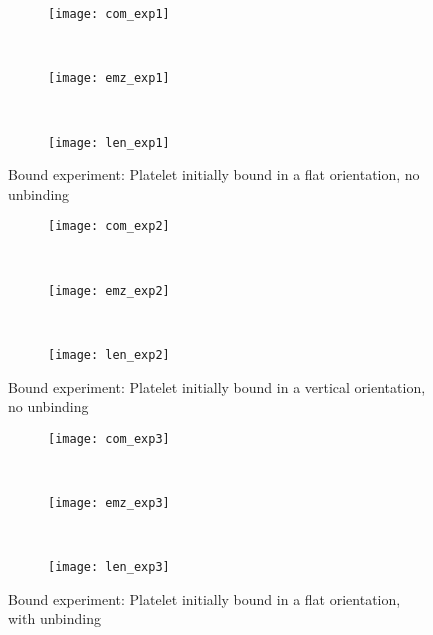 \documentclass{article}
\begin{document}
\begin{figure}
  \centering
  \begin{subfigure}{.5\textwidth}
    \texttt{[image: com\_exp1]}
  \end{subfigure}
  \\
  \begin{subfigure}{.5\textwidth}
    \texttt{[image: emz\_exp1]}
  \end{subfigure}
  \\
  \begin{subfigure}{.5\textwidth}
    \texttt{[image: len\_exp1]}
  \end{subfigure}
  \caption{Bound experiment: Platelet initially bound in a flat
    orientation, no unbinding}
  \label{fig:exp1}
\end{figure}

\begin{figure}
  \centering
  \begin{subfigure}{.5\textwidth}
    \texttt{[image: com\_exp2]}
  \end{subfigure}
  \\
  \begin{subfigure}{.5\textwidth}
    \texttt{[image: emz\_exp2]}
  \end{subfigure}
  \\
  \begin{subfigure}{.5\textwidth}
    \texttt{[image: len\_exp2]}
  \end{subfigure}
  \caption{Bound experiment: Platelet initially bound in a vertical
    orientation, no unbinding}
  \label{fig:exp2}
\end{figure}

\begin{figure}
  \centering
  \begin{subfigure}{.5\textwidth}
    \texttt{[image: com\_exp3]}
  \end{subfigure}
  \\
  \begin{subfigure}{.5\textwidth}
    \texttt{[image: emz\_exp3]}
  \end{subfigure}
  \\
  \begin{subfigure}{.5\textwidth}
    \texttt{[image: len\_exp3]}
  \end{subfigure}
  \caption{Bound experiment: Platelet initially bound in a flat
    orientation, with unbinding}
  \label{fig:exp3}
\end{figure}
\end{document}
